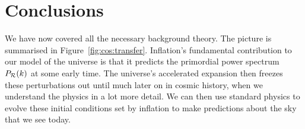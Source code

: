 \section{Conclusions}
We have now covered all the necessary background theory. The picture is summarised in Figure~\ref{fig:cos:transfer}. Inflation's fundamental contribution to our model of the universe is that it predicts the primordial power spectrum \(P_\mathcal{R}(k)\) at some early time. The universe's accelerated expansion then freezes these perturbations out until much later on in cosmic history, when we understand the physics in a lot more detail. We can then use standard physics to evolve these initial conditions set by inflation to make predictions about the sky that we see today.


